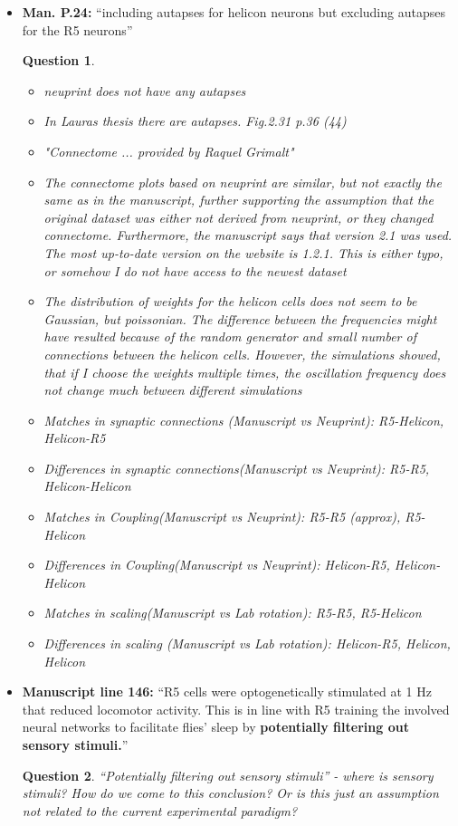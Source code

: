 \documentclass[11pt]{article}
\theoremstyle{questionstyle}
\newtheorem{question}{Question}
\theoremstyle{defaultstyle}
\begin{document}
\begin{itemize}
    \item \textbf{Man. P.24:} “including autapses for helicon neurons but excluding autapses for the R5 neurons”
    \begin{question}
        \begin{itemize}
            \item neuprint does not have any autapses
            \item In Lauras thesis there are autapses. Fig.2.31 p.36 (44)
            \item "Connectome ... provided by Raquel Grimalt"
            \item The connectome plots based on neuprint are similar, but not exactly the same as in the manuscript, further supporting the assumption that the original dataset was either not derived from neuprint, or they changed connectome. Furthermore, the manuscript says that version 2.1 was used. The most up-to-date version on the website is 1.2.1. This is either typo, or somehow I do not have access to the newest dataset
            \item The distribution of weights for the helicon cells does not seem to be Gaussian, but poissonian. The difference between the frequencies might have resulted because of the random generator and small number of connections between the helicon cells. However, the simulations showed, that if I choose the weights multiple times, the oscillation frequency does not change much between different simulations
            \item Matches in synaptic connections (Manuscript vs Neuprint): R5-Helicon, Helicon-R5
            \item Differences in synaptic connections(Manuscript vs Neuprint): R5-R5, Helicon-Helicon
            \item Matches in Coupling(Manuscript vs Neuprint): R5-R5 (approx), R5-Helicon
            \item Differences in Coupling(Manuscript vs Neuprint): Helicon-R5, Helicon-Helicon
            \item Matches in scaling(Manuscript vs Lab rotation): R5-R5, R5-Helicon
            \item Differences in scaling (Manuscript vs Lab rotation): Helicon-R5, Helicon, Helicon
        \end{itemize}
    \end{question}


    \item \textbf{Manuscript line 146:} “R5 cells were optogenetically stimulated at 1 Hz that reduced locomotor activity. This is in line with R5 training the involved neural networks to facilitate flies’ sleep by \textbf{potentially filtering out sensory stimuli.}”
    \begin{question}
        “Potentially filtering out sensory stimuli” - where is sensory stimuli? How do we come to this conclusion? Or is this just an assumption not related to the current experimental paradigm?
    \end{question}


\end{itemize}
\end{document}
